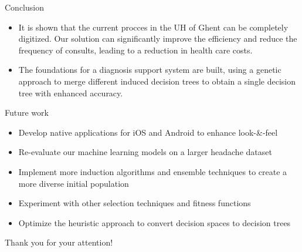 \documentclass[english]{beamer}
\begin{document}



\begin{frame}{Conclusion}
	\begin{itemize}
		\item It is shown that the current procces in the UH of Ghent can be completely digitized. Our solution can significantly improve the efficiency and reduce the frequency of consults, leading to a reduction
		in health care costs. \vspace{2em}
		\item The foundations for a diagnosis support system are built, using a genetic approach to merge different induced decision trees to obtain a single decision tree with enhanced accuracy.
	\end{itemize}
\end{frame}

\begin{frame}{Future work}
	\begin{itemize}
		\item Develop native applications for iOS and Android to enhance look-\&-feel
		\item Re-evaluate our machine learning models on a larger headache dataset
		\item Implement more induction algorithms and ensemble techniques to create a more diverse initial population
		\item Experiment with other selection techniques
		and fitness functions
		\item Optimize the heuristic approach to convert decision spaces to decision trees
	\end{itemize}
\end{frame}

{
\begin{frame}{Thank you for your attention!}
	\scriptsize{\tableofcontents[hidesubsections]}
\end{frame} }
\end{document}
